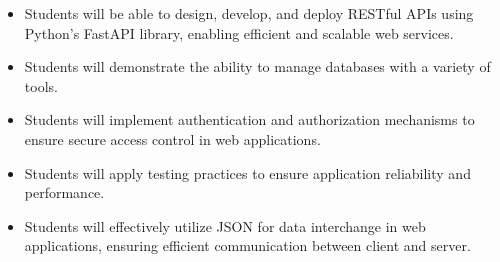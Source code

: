 \begin{itemize}
    \item Students will be able to design, develop, and deploy RESTful APIs using Python's FastAPI library, enabling efficient and scalable web services.
    \item Students will demonstrate the ability to manage databases with a variety of tools.
    \item Students will implement authentication and authorization mechanisms to ensure secure access control in web applications.
    \item Students will apply testing practices to ensure application reliability and performance.
    \item Students will effectively utilize JSON for data interchange in web applications, ensuring efficient communication between client and server.
\end{itemize}
